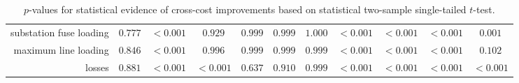 \begin{sidewaystable}
\begin{tabular}{cc|ccccccccc|}
\multicolumn{1}{r|}{substation fuse loading} & $0.777$ & \cellcolor{light_blue}$<0.001$ & $0.929$ & $0.999$ & $0.999$ & $1.000$ & \cellcolor{light_blue}$<0.001$ & \cellcolor{light_blue}$<0.001$ & \cellcolor{light_blue}$<0.001$ & \cellcolor{light_blue}$0.001$ \\
\multicolumn{1}{r|}{maximum line loading} & $0.846$ & \cellcolor{light_blue}$<0.001$ & $0.996$ & $0.999$ & $0.999$ & $0.999$ & \cellcolor{light_blue}$<0.001$ & \cellcolor{light_blue}$<0.001$ & \cellcolor{light_blue}$<0.001$ & $0.102$ \\
\multicolumn{1}{r|}{losses} & $0.881$ & \cellcolor{light_blue}$<0.001$ & \cellcolor{light_blue}$<0.001$ & $0.637$ & $0.910$ & $0.999$ & \cellcolor{light_blue}$<0.001$ & \cellcolor{light_blue}$<0.001$ & \cellcolor{light_blue}$<0.001$ & \cellcolor{light_blue}$<0.001$ \\
\end{tabular}
\caption{$p$-values for statistical evidence of cross-cost improvements based on statistical two-sample single-tailed $t$-test.}
\label{ch1:tab:t-test-table}
\end{sidewaystable}
